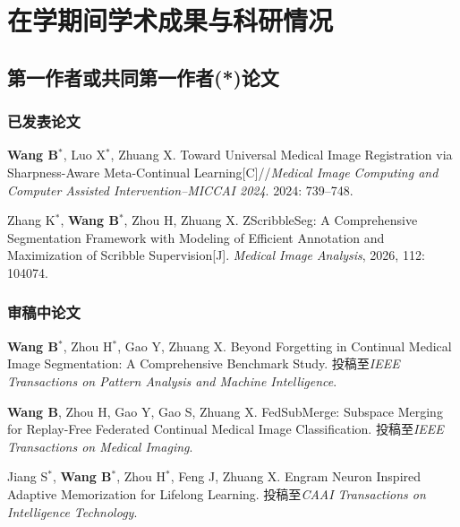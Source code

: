\chapter{在学期间学术成果与科研情况}
\label{app:publications}
\setlength{\emergencystretch}{2em}

\section{第一作者或共同第一作者(*)论文}

\subsection*{已发表论文}
\begin{enumerate}[leftmargin=2.3em,label={[\arabic*]},itemsep=0.55em,topsep=0.4em]
  \item \textbf{Wang B}$^{*}$, Luo X$^{*}$, Zhuang X. Toward Universal Medical Image Registration via Sharpness-Aware Meta-Continual Learning[C]//\emph{Medical Image Computing and Computer Assisted Intervention--MICCAI 2024}. 2024: 739--748.

  \item Zhang K$^{*}$, \textbf{Wang B}$^{*}$, Zhou H, Zhuang X. ZScribbleSeg: A Comprehensive Segmentation Framework with Modeling of Efficient Annotation and Maximization of Scribble Supervision[J]. \emph{Medical Image Analysis}, 2026, 112: 104074.
\end{enumerate}

\subsection*{审稿中论文}
\begin{enumerate}[leftmargin=2.3em,label={[\arabic*]},itemsep=0.55em,topsep=0.4em,resume]
  \item \textbf{Wang B}$^{*}$, Zhou H$^{*}$, Gao Y, Zhuang X. Beyond Forgetting in Continual Medical Image Segmentation: A Comprehensive Benchmark Study. 投稿至\emph{IEEE Transactions on Pattern Analysis and Machine Intelligence}.

  \item \textbf{Wang B}, Zhou H, Gao Y, Gao S, Zhuang X. FedSubMerge: Subspace Merging for Replay-Free Federated Continual Medical Image Classification. 投稿至\emph{IEEE Transactions on Medical Imaging}.

  \item Jiang S$^{*}$, \textbf{Wang B}$^{*}$, Zhou H$^{*}$, Feng J, Zhuang X. Engram Neuron Inspired Adaptive Memorization for Lifelong Learning. 投稿至\emph{CAAI Transactions on Intelligence Technology}.
\end{enumerate}

